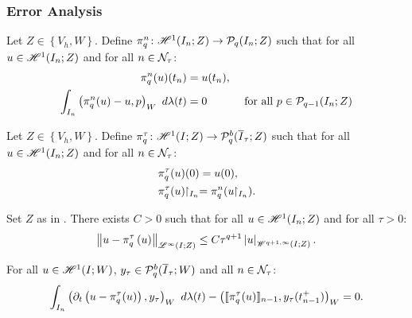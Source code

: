 \newpage
\subsubsection{Error Analysis}

\begin{definition}[$\InterpolantQN$] \label{def:interpolant_qn}
    Let $Z \in \left\{V_h, W\right\}$. Define $\pi^n_q \colon \mathscr{H}^{1}(I_n; Z) \rightarrow \mathcal{P}_{q}(I_n; Z)$ such that for all $u \in \mathscr{H}^{1}(I_n; Z)$ and for all $n \in \mathcal{N}_{\tau}$:
    \begin{align}
        \pi^n_q(u)(t_n) & = u(t_n), \\
        \int_{I_n} \left( \pi^n_q(u) - u, p \right)_W ~ d \lambda(t) &= 0 &\text{ for all } p \in \mathcal{P}_{q - 1}(I_n; Z)
    \end{align}
\end{definition}

\begin{definition}[$\InterpolantQT$] \label{def:interpolant_qt}
    Let $Z \in \left\{V_h, W\right\}$. Define $\pi^{\tau}_q \colon \mathscr{H}^{1}(I; Z) \rightarrow \mathcal{P}_{q}^b(\overline{I}_{\tau}; Z)$ such that for all $u \in \mathscr{H}^{1}(I_n; Z)$ and for all $n \in \mathcal{N}_{\tau}$:
    \begin{align}
        & \pi^{\tau}_q(u)(0) = u(0), \\
        & \pi^{\tau}_q(u) \!\!\restriction_{I_n} = \pi^n_q(u \!\!\restriction_{I_n}).
    \end{align}
\end{definition}

\begin{proposition} \label{prop:interpolant_qt}
    Set $Z$ as in . There exists $C > 0$ such that for all $u \in \mathscr{H}^{1}(I_n; Z)$ and for all $\tau > 0$:
    \begin{align}
        \left\lVert  u - \pi^{\tau}_q \left( u \right)  \right\rVert_{\mathscr{L}^{\infty}(I; Z)} \leq C \tau^{q + 1} \left\lvert  u  \right\rvert_{\mathscr{W}^{q + 1, \infty}(I; Z)}.
    \end{align}
\end{proposition}

\begin{lemma}[Orthogonality] \label{lemma:orthogonality}
    For all $u \in \mathscr{H}^{1}(I; W)$, $y_{\tau} \in \mathcal{P}_{q}^b(\overline{I}_{\tau}; W)$ and all $n \in \mathcal{N}_{\tau}$:
    \begin{align}
        \int_{I_n} \left( \partial_t \left( u - \pi^{\tau}_q(u) \right), y_{\tau} \right)_W ~ d \lambda(t) - \left( \llbracket \pi^{\tau}_q(u) \rrbracket_{n - 1}, y_{\tau}(t_{n - 1}^+) \right)_W = 0.
    \end{align}
\end{lemma}

